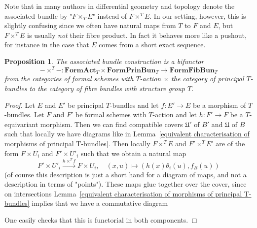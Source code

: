 \documentclass[10pt,oneside]{amsart}
\newtheorem{proposition}[theorem]{Proposition}
\theoremstyle{definition}
\theoremstyle{remark}
\begin{document}
	Note that in many authors in differential geometry and topology denote the associated bundle by "$F\times_T E$" instead of $F\times^T E$. In our setting, however, this is slightly confusing since we often have natural maps from $T$ to $F$ and $E$, but $F\times^T E$ is usually \textit{not} their fibre product. In fact it behaves more like a pushout, for instance in the case that $E$ comes from a short exact sequence.
	
	\begin{proposition}\label{associated bundle construction is bifunctor}
		The associated bundle construction is a bifunctor \[-\times^T-:\mathbf{FormAct}_T\times \mathbf{FormPrinBun}_T\rightarrow \mathbf{FormFibBun}_T\] 
		from the categories of formal schemes with $T$-action $\times$ the category of principal $T$-bundles to the category of fibre bundles with structure group $T$.
	\end{proposition}
	\begin{proof}
		Let $E$ and $E'$ be principal $T$-bundles and let $f:E'\rightarrow E$ be a morphism of $T$-bundles. Let $F$ and $F'$ be formal schemes with $T$-action and let $h:F'\rightarrow F$ be a $T$-equivariant morphism. Then we can find compatible covers $\mathfrak U'$ of $B'$ and $\mathfrak U$ of $B$ such that locally we have diagrams like in Lemma~\ref{equivalent characterisation of morphisms of principal T-bundles}. Then locally $F\times^T E$ and $F'\times^T E'$ are of the form $F\times U_i$ and $F'\times U'_i$ such that we obtain a natural map
		\[F'\times U'_i\xrightarrow{h\times^T f} F\times U_i, \quad (x,u)\mapsto (h(x)\theta_i(u),f_B(u))\]
		(of course this description is just a short hand for a diagram of maps, and not a description in terms of "points"). These maps glue together over the cover, since on intersections Lemma~\ref{equivalent characterisation of morphisms of principal T-bundles} implies that we have a commutative diagram
		\begin{center}
		\end{center}
		One easily checks that this is functorial in both components.
	\end{proof}
	
\end{document}
